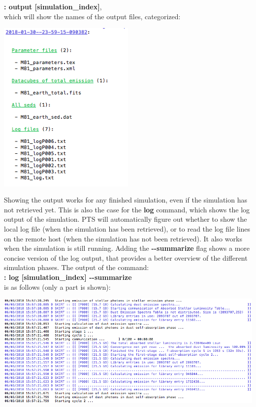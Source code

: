 \documentclass[15pt,a4paper,oneside,openright]{report}
\begin{document}
\textbf{: output [simulation\_index]},\\

which will show the names of the output files, categorized:

\begin{center}
\includegraphics[width=0.5\textwidth]{figures/output.png}
\end{center}

Showing the output works for any finished simulation, even if the simulation has not retrieved yet. This is also the case for the \textbf{log} command, which shows the log output of the simulation. PTS will automatically figure out whether to show the local log file (when the simulation has been retrieved), or to read the log file lines on the remote host (when the simulation has not been retrieved). It also works when the simulation is still running. Adding the \textbf{-{}-summarize} flag shows a more concise version of the log output, that provides a better overview of the different simulation phases. The output of the command:\\

\textbf{: log [simulation\_index] -{}-summarize}\\

is as follows (only a part is shown):

\begin{center}
\includegraphics[width=\textwidth]{figures/log_summary.png}
\end{center}
\end{document}
